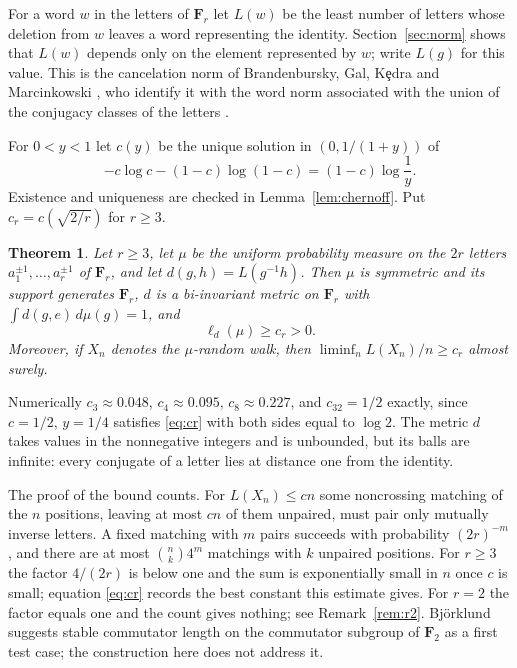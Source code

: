 \documentclass[11pt]{amsart}
\newtheorem{theorem}{Theorem}[section]
\theoremstyle{definition}
\theoremstyle{remark}
\numberwithin{equation}{section}
\newcommand{\F}{\mathbf F}
\begin{document}
For a word $w$ in the letters of $\F_r$ let $L(w)$ be the least number of letters whose deletion from $w$ leaves a word representing the identity. Section~\ref{sec:norm} shows that $L(w)$ depends only on the element represented by $w$; write $L(g)$ for this value. This is the cancelation norm of Brandenbursky, Gal, K\c{e}dra and Marcinkowski \cite{BGKM}, who identify it with the word norm associated with the union of the conjugacy classes of the letters \cite[Proposition~2.A]{BGKM}.

For $0<y<1$ let $c(y)$ be the unique solution in $(0,1/(1+y))$ of
\begin{equation}\label{eq:cr}
-c\log c-(1-c)\log(1-c)=(1-c)\log\frac1y .
\end{equation}
Existence and uniqueness are checked in Lemma~\ref{lem:chernoff}. Put $c_r=c(\sqrt{2/r})$ for $r\ge3$.

\begin{theorem}\label{thm:main}
Let $r\ge3$, let $\mu$ be the uniform probability measure on the $2r$ letters $a_1^{\pm1},\dots,a_r^{\pm1}$ of $\F_r$, and let $d(g,h)=L(g^{-1}h)$. Then $\mu$ is symmetric and its support generates $\F_r$, $d$ is a bi-invariant metric on $\F_r$ with $\int d(g,e)\,d\mu(g)=1$, and
\[
\ell_d(\mu)\ge c_r>0 .
\]
Moreover, if $X_n$ denotes the $\mu$-random walk, then $\liminf_n L(X_n)/n\ge c_r$ almost surely.
\end{theorem}

Numerically $c_3\approx0.048$, $c_4\approx0.095$, $c_8\approx0.227$, and $c_{32}=1/2$ exactly, since $c=1/2$, $y=1/4$ satisfies \eqref{eq:cr} with both sides equal to $\log2$. The metric $d$ takes values in the nonnegative integers and is unbounded, but its balls are infinite: every conjugate of a letter lies at distance one from the identity.

The proof of the bound counts. For $L(X_n)\le cn$ some noncrossing matching of the $n$ positions, leaving at most $cn$ of them unpaired, must pair only mutually inverse letters. A fixed matching with $m$ pairs succeeds with probability $(2r)^{-m}$, and there are at most $\binom nk4^m$ matchings with $k$ unpaired positions. For $r\ge3$ the factor $4/(2r)$ is below one and the sum is exponentially small in $n$ once $c$ is small; equation \eqref{eq:cr} records the best constant this estimate gives. For $r=2$ the factor equals one and the count gives nothing; see Remark~\ref{rem:r2}. Bj\"orklund suggests stable commutator length on the commutator subgroup of $\F_2$ as a first test case; the construction here does not address it.
\end{document}
